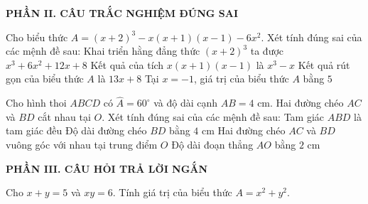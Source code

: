 \documentclass[12pt,a4paper]{article}
\begin{document}
\setcounter{ex}{0}
\noindent\textbf{\large PHẦN II. CÂU TRẮC NGHIỆM ĐÚNG SAI}
\vspace{1mm}
\begin{ex}
Cho biểu thức $A = (x + 2)^3 - x(x + 1)(x - 1) - 6x^2$. Xét tính đúng sai của các mệnh đề sau:
\choiceTF
{\True Khai triển hằng đẳng thức $(x + 2)^3$ ta được $x^3 + 6x^2 + 12x + 8$}
{\True Kết quả của tích $x(x + 1)(x - 1)$ là $x^3 - x$}
{\True Kết quả rút gọn của biểu thức $A$ là $13x + 8$}
{Tại $x = -1$, giá trị của biểu thức $A$ bằng $5$}
\end{ex}

\begin{ex}
Cho hình thoi $ABCD$ có $\widehat{A} = 60^\circ$ và độ dài cạnh $AB = 4\text{ cm}$. Hai đường chéo $AC$ và $BD$ cắt nhau tại $O$. Xét tính đúng sai của các mệnh đề sau:
\choiceTF
{\True Tam giác $ABD$ là tam giác đều}
{\True Độ dài đường chéo $BD$ bằng $4\text{ cm}$}
{\True Hai đường chéo $AC$ và $BD$ vuông góc với nhau tại trung điểm $O$}
{Độ dài đoạn thẳng $AO$ bằng $2\text{ cm}$}
\end{ex}


\setcounter{ex}{0}
\noindent\textbf{\large PHẦN III. CÂU HỎI TRẢ LỜI NGẮN}
\vspace{1mm}
\begin{ex}
Cho $x + y = 5$ và $xy = 6$. Tính giá trị của biểu thức $A = x^2 + y^2$. 
\end{ex}
\end{document}
